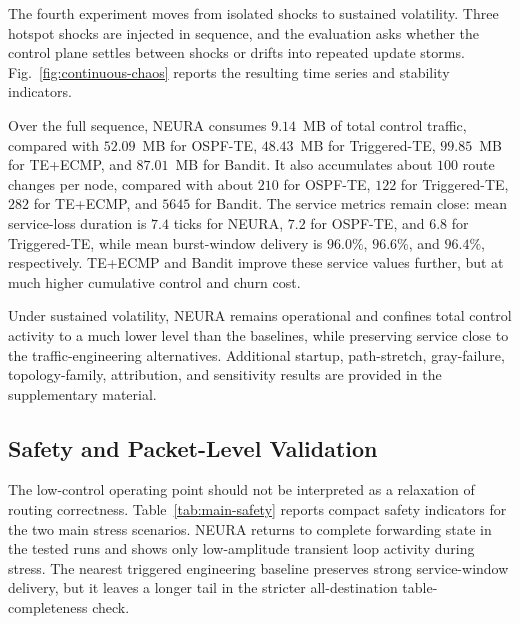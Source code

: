 \documentclass[5p,times]{elsarticle}
\begin{document}
The fourth experiment moves from isolated shocks to sustained volatility. Three hotspot shocks are injected in sequence, and the evaluation asks whether the control plane settles between shocks or drifts into repeated update storms. Fig.~\ref{fig:continuous-chaos} reports the resulting time series and stability indicators.

Over the full sequence, NEURA consumes $9.14$~MB of total control traffic, compared with $52.09$~MB for OSPF-TE, $48.43$~MB for Triggered-TE, $99.85$~MB for TE+ECMP, and $87.01$~MB for Bandit. It also accumulates about $100$ route changes per node, compared with about $210$ for OSPF-TE, $122$ for Triggered-TE, $282$ for TE+ECMP, and $5645$ for Bandit. The service metrics remain close: mean service-loss duration is $7.4$ ticks for NEURA, $7.2$ for OSPF-TE, and $6.8$ for Triggered-TE, while mean burst-window delivery is $96.0\%$, $96.6\%$, and $96.4\%$, respectively. TE+ECMP and Bandit improve these service values further, but at much higher cumulative control and churn cost.

Under sustained volatility, NEURA remains operational and confines total control activity to a much lower level than the baselines, while preserving service close to the traffic-engineering alternatives. Additional startup, path-stretch, gray-failure, topology-family, attribution, and sensitivity results are provided in the supplementary material.


\subsection{Safety and Packet-Level Validation}

The low-control operating point should not be interpreted as a relaxation of routing correctness. Table~\ref{tab:main-safety} reports compact safety indicators for the two main stress scenarios. NEURA returns to complete forwarding state in the tested runs and shows only low-amplitude transient loop activity during stress. The nearest triggered engineering baseline preserves strong service-window delivery, but it leaves a longer tail in the stricter all-destination table-completeness check.
\end{document}
